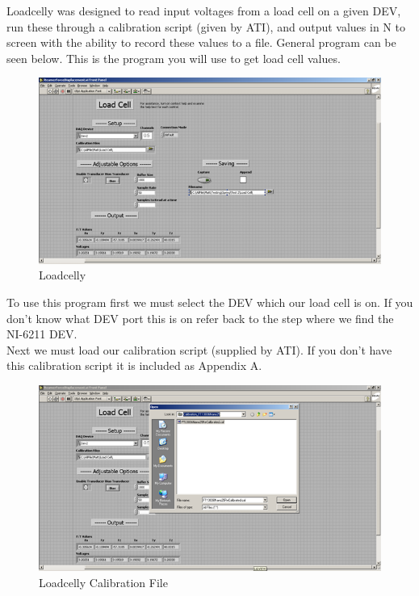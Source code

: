 \documentclass[pdftex,11pt,letterpaper]{article}
\begin{document}
Loadcelly was designed to read input voltages from a load cell on a given DEV, run these through a calibration script (given by ATI), and output values in N to screen with the ability to record these values to a file. General program can be seen below. This is the program you will use to get load cell values. \\

\begin{figure}[ht!]
\centering
\includegraphics[width=150mm]{./images/celly}
\caption{Loadcelly}
\end{figure}

To use this program first we must select the DEV which our load cell is on. If you don’t know what DEV port this is on refer back to the step where we find the NI-6211 DEV. \\

Next we must load our calibration script (supplied by ATI). If you don’t have this calibration script it is included as Appendix A.  

\begin{figure}[ht!]
\centering
\includegraphics[width=150mm]{./images/celly_2}
\caption{Loadcelly Calibration File}
\end{figure}
\end{document}
